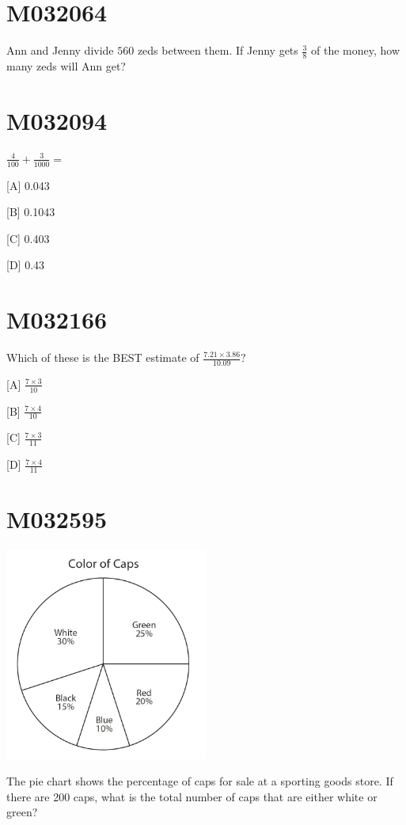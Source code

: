 \documentclass[12pt]{article}
\author{Qixiang Fang}
\date{\today}
\begin{document}
\section*{M032064}

Ann and Jenny divide $560$ zeds between them. If Jenny gets $\frac{3}{8}$ of the money, how many zeds will Ann get?

\newpage
\section*{M032094}

$\frac{4}{100}+\frac{3}{1000}=$

[A] 0.043

[B] 0.1043

[C] 0.403

[D] 0.43

\newpage
\section*{M032166}

Which of these is the BEST estimate of $\frac{7.21 \times 3.86}{10.09} ?$

[A] $\frac{7 \times 3}{10}$

[B] $\frac{7 \times 4}{10}$

[C] $\frac{7 \times 3}{11}$

[D] $\frac{7 \times 4}{11}$



\newpage
\section*{M032595}

\includegraphics[width=0.5\textwidth]{2024_02_20_828ebc9d68bcc1fbb223g-04}

The pie chart shows the percentage of caps for sale at a sporting goods store. If there are 200 caps, what is the total number of caps that are either white or green?
\end{document}
